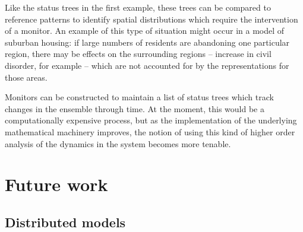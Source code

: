 Like the status trees in the first example, these trees can be
compared to reference patterns to identify spatial distributions which
require the intervention of a monitor.  An example of this type of
situation might occur in a model of suburban housing: if large numbers
of residents are abandoning one particular region, there may be effects
on the surrounding regions -- increase in civil disorder, for example
-- which are not accounted for by the representations for those areas.

Monitors can be constructed to maintain a list of status trees which
track changes in the ensemble through time. At the moment, this would
be a computationally expensive process, but as the
implementation of the underlying mathematical machinery improves, the
notion of using this kind of higher order analysis of the dynamics in
the system becomes more tenable.




\section{Future work}

\subsection{Distributed models}\label{distributedmodels}

